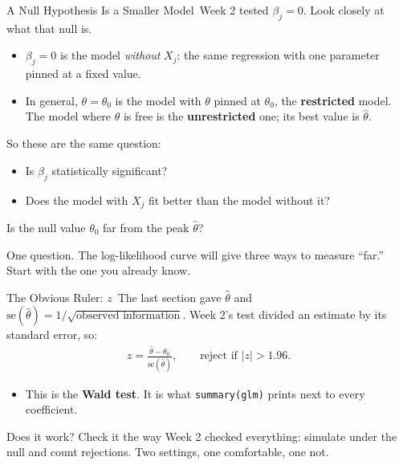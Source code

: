 \documentclass[aspectratio=169,11pt,xcolor=dvipsnames]{beamer}
\newcommand{\SE}{\mathrm{se}}
\newcommand{\core}{\,\raisebox{0.6pt}{\textcolor{corestar}{$\bigstar$}}}
\begin{document}
\begin{frame}{A Null Hypothesis Is a Smaller Model\core}
Week 2 tested $\beta_j = 0$. Look closely at what that null is.
\begin{itemize}\itemsep5pt
  \item $\beta_j = 0$ is the model \emph{without} $X_j$: the same regression
        with one parameter pinned at a fixed value.
  \item In general, $\theta = \theta_0$ is the model with $\theta$ pinned at
        $\theta_0$, the \textbf{restricted} model. The model where $\theta$ is
        free is the \textbf{unrestricted} one; its best value is $\hat\theta$.
\end{itemize}
\vskip6pt
So these are the same question:
\begin{itemize}\itemsep4pt
  \item Is $\hat\beta_j$ statistically significant?
  \item Does the model with $X_j$ fit better than the model without it?
\end{itemize}
\vskip6pt
\begin{center}
\alert{Is the null value $\theta_0$ far from the peak $\hat\theta$?}
\end{center}
One question. The log-likelihood curve will give three ways to measure
``far.'' Start with the one you already know.
\end{frame}

\begin{frame}{The Obvious Ruler: $z$\core}
The last section gave $\hat\theta$ and
$\SE(\hat\theta) = 1/\sqrt{\text{observed information}}$. Week 2's test
divided an estimate by its standard error, so:
\begin{align*}
  z = \frac{\hat\theta - \theta_0}{\SE(\hat\theta)} ,
  \qquad \text{reject if } |z| > 1.96 .
\end{align*}
\begin{itemize}\itemsep5pt
  \item This is the \textbf{Wald test}. It is what \texttt{summary(glm)}
        prints next to every coefficient.
\end{itemize}
\vskip6pt
Does it work? Check it the way Week 2 checked everything: simulate under the
null and count rejections. Two settings, one comfortable, one not.
\end{frame}
\end{document}
